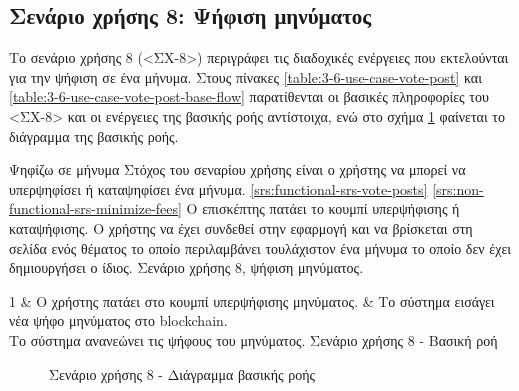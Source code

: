 \subsection{Σενάριο χρήσης 8: Ψήφιση μηνύματος} \label{subsection:3-6-use-case-vote-post}

Το σενάριο χρήσης 8 (<ΣΧ-8>) περιγράφει τις διαδοχικές ενέργειες που εκτελούνται για την ψήφιση σε ένα μήνυμα. Στους πίνακες \ref{table:3-6-use-case-vote-post} και \ref{table:3-6-use-case-vote-post-base-flow} παρατίθενται οι βασικές πληροφορίες του <ΣΧ-8> και οι ενέργειες της βασικής ροής αντίστοιχα, ενώ στο σχήμα \ref{figure:3-6-use-case-vote-post-base-flow-sequence-diagram} φαίνεται το διάγραμμα της βασικής ροής.

\useCaseTable
{Ψηφίζω σε μήνυμα}
{Στόχος του σεναρίου χρήσης είναι ο χρήστης να μπορεί να υπερψηφίσει ή καταψηφίσει ένα μήνυμα.}
{\ref{srs:functional-srs-vote-posts}}
{\ref{srs:non-functional-srs-minimize-fees}}
{Ο επισκέπτης πατάει το κουμπί υπερψήφισης ή καταψήφισης.}
{Ο χρήστης να έχει συνδεθεί στην εφαρμογή και να βρίσκεται στη σελίδα ενός θέματος το οποίο περιλαμβάνει τουλάχιστον ένα μήνυμα το οποίο δεν έχει δημιουργήσει ο ίδιος.}
{Σενάριο χρήσης 8, ψήφιση μηνύματος.}
{\label{table:3-6-use-case-vote-post}}


\useCaseBaseFlowTable
{
    1 & Ο χρήστης πατάει στο κουμπί υπερψήφισης μηνύματος. & Το σύστημα εισάγει νέα ψήφο μηνύματος στο blockchain. \\ [0.5ex]
}
{Το σύστημα ανανεώνει τις ψήφους του μηνύματος.}
{Σενάριο χρήσης 8 - Βασική ροή}
{\label{table:3-6-use-case-vote-post-base-flow}}

\begin{figure}[H]
    \centering
    
    \caption{Σενάριο χρήσης 8 - Διάγραμμα βασικής ροής}
    \label{figure:3-6-use-case-vote-post-base-flow-sequence-diagram}
\end{figure}
